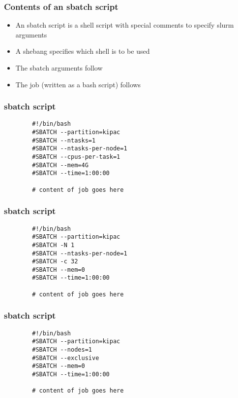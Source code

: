 \documentclass[aspectratio=169]{beamer}
\begin{document}



\begin{frame}
	\frametitle{Contents of an sbatch script}
	\begin{itemize}
		\item An sbatch script is a shell script with special comments to specify slurm arguments
		\item A shebang specifies which shell is to be used
		\item The sbatch arguments follow
		\item The job (written as a bash script) follows
	\end{itemize}
\end{frame}

\begin{frame}[fragile]
	\frametitle{sbatch script}
	\begin{verbatim}
		#!/bin/bash
		#SBATCH --partition=kipac
		#SBATCH --ntasks=1
		#SBATCH --ntasks-per-node=1
		#SBATCH --cpus-per-task=1
		#SBATCH --mem=4G
		#SBATCH --time=1:00:00
		
		# content of job goes here
	\end{verbatim}
\end{frame}

\begin{frame}[fragile]
	\frametitle{sbatch script}
	\begin{verbatim}
		#!/bin/bash
		#SBATCH --partition=kipac
		#SBATCH -N 1
		#SBATCH --ntasks-per-node=1
		#SBATCH -c 32
		#SBATCH --mem=0
		#SBATCH --time=1:00:00
		
		# content of job goes here
	\end{verbatim}
\end{frame}

\begin{frame}[fragile]
	\frametitle{sbatch script}
	\begin{verbatim}
		#!/bin/bash
		#SBATCH --partition=kipac
		#SBATCH --nodes=1
		#SBATCH --exclusive
		#SBATCH --mem=0
		#SBATCH --time=1:00:00
		
		# content of job goes here
	\end{verbatim}
\end{frame}
\end{document}
